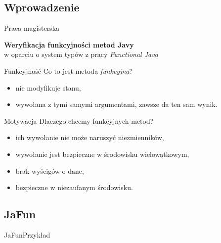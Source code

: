\documentclass{beamer}
\begin{document}
\subsection{Wprowadzenie}

\begin{frame}{Praca magisterska}
\begin{center}
  \textbf{Weryfikacja funkcyjności metod Javy}\\
  w oparciu o system typów z pracy \emph{Functional Java}
\end{center}
\end{frame}

\begin{frame}{Funkcyjność}
  Co to jest metoda \emph{funkcyjna}?
  \begin{itemize}
  \item<1-> nie modyfikuje stanu,
  \item<2-> wywołana z tymi samymi argumentami, zawsze da ten sam wynik.
  \end{itemize}
\end{frame}

\begin{frame}{Motywacja}
  Dlaczego chcemy funkcyjnych metod?
  \begin{itemize}
  \item<1-> ich wywołanie nie może naruszyć niezmienników,
  \item<2-> wywołanie jest bezpieczne w środowisku wielowątkowym, 
  \item<2-> brak wyścigów o dane,
  \item<3-> bezpieczne w niezaufanym środowisku.
  \end{itemize}
\end{frame}

\subsection{JaFun}

\begin{frame}{JaFun}{Przykład}
  
\end{frame}
\end{document}
